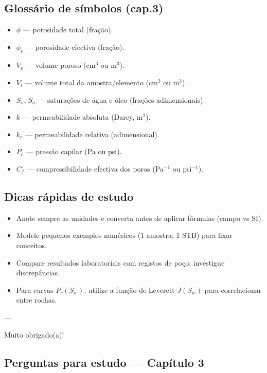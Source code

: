 \documentclass[11pt,a4paper]{article}
\begin{document}
\subsection{Glossário de símbolos (cap.3)}
\begin{itemize}
\item $\phi$ — porosidade total (fração).
\item $\phi_e$ — porosidade efectiva (fração).
\item $V_p$ — volume poroso (cm$^3$ ou m$^3$).
\item $V_t$ — volume total da amostra/elemento (cm$^3$ ou m$^3$).
\item $S_w, S_o$ — saturações de água e óleo (frações adimensionais).
\item $k$ — permeabilidade absoluta (Darcy, m$^2$).
\item $k_r$ — permeabilidade relativa (adimensional).
\item $P_c$ — pressão capilar (Pa ou psi).
\item $C_f$ — compressibilidade efectiva dos poros (Pa$^{-1}$ ou psi$^{-1}$).
\end{itemize}

\subsection{Dicas rápidas de estudo}
\begin{itemize}
\item Anote sempre as unidades e converta antes de aplicar fórmulas (campo vs SI).
\item Modele pequenos exemplos numéricos (1 amostra; 1 STB) para fixar conceitos.
\item Compare resultados laboratoriais com registos de poço; investigue discrepâncias.
\item Para curvas $P_c(S_w)$, utilize a função de Leverett $J(S_w)$ para correlacionar entre rochas.
\end{itemize}

---

Muito obrigado(a)!

\subsection*{Perguntas para estudo --- Capítulo 3}

\end{document}
